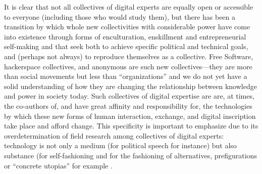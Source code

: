 \documentclass[10pt,letter,oneside]{scrartcl}
\begin{document}
It is clear that not all collectives of digital experts are equally
open or accessible to everyone (including those who would study them),
but there has been a transition by which whole new collectivities with
considerable power have come into existence through forms of
enculturation, enskillment and entrepreneurial self-making and that
seek both to achieve specific political and technical goals, and
(perhaps not always) to reproduce themselves as a collective.  Free
Software, hackerspace collectives, and anonymous are such new
collectives---they are more than social movements but less than
``organizations'' and we do not yet have a solid understanding of how
they are changing the relationship between knowledge and power in
society today. Such collectives of digital expertise are are, at
times, the co-authors of, and have great affinity and responsibility
for, the technologies by which these new forms of human interaction,
exchange, and digital inscription take place and afford change. This
specificity is important to emphasize due to its overdetermination of
field research among collectives of digital experts: technology is not only a
medium (for political speech for instance) but also substance (for
self-fashioning and for the fashioning of alternatives, prefigurations
\cite{Graeber-prefig} or ``concrete utopias'' for example \cite{bloch-hope,Broca}. 



\end{document}
